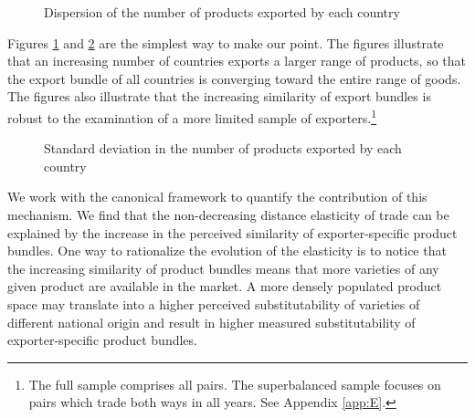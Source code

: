 \documentclass[12pt,twoside,a4paper,notitlepage]{article}
\begin{document}
\begin{figure}[h!]
	\caption{Dispersion of the number of products exported by each country \label{fig:vioplot}}
	\begin{center}
		\setlength{\fboxrule}{1pt} %
		\setlength{\fboxsep}{.1in} %
	\end{center}
\end{figure}


Figures \ref{fig:vioplot} and \ref{fig:fall_of_sd} are the simplest way to make our point. 
The figures illustrate that an increasing number of countries exports a larger range of products, so that the export bundle of all countries is converging toward the entire range of goods.
The figures also illustrate that the increasing similarity of export bundles is robust to the examination of a more limited sample of exporters.\footnote{The full sample comprises all pairs. The superbalanced sample focuses on pairs which trade both ways in all years. See Appendix \ref{app:E}.} 


\begin{figure}[h!]
	\caption{Standard deviation in the number of products exported by each country \label{fig:fall_of_sd}}
	\begin{center}
		\setlength{\fboxrule}{1pt} %
		\setlength{\fboxsep}{.1in} %
	\end{center}
\end{figure}

We work with the canonical \cite{Anderson2003} framework to quantify the contribution of this mechanism. 
We find that the non-decreasing distance elasticity of trade can be explained by the increase in the perceived similarity of exporter-specific product bundles. 
One way to rationalize the evolution of the elasticity is to notice that the increasing similarity of product bundles means that more varieties of any given product are available in the market. 
A more densely populated product space may translate into a higher perceived substitutability of varieties of different national origin and result in higher measured substitutability of exporter-specific product bundles.
\end{document}

